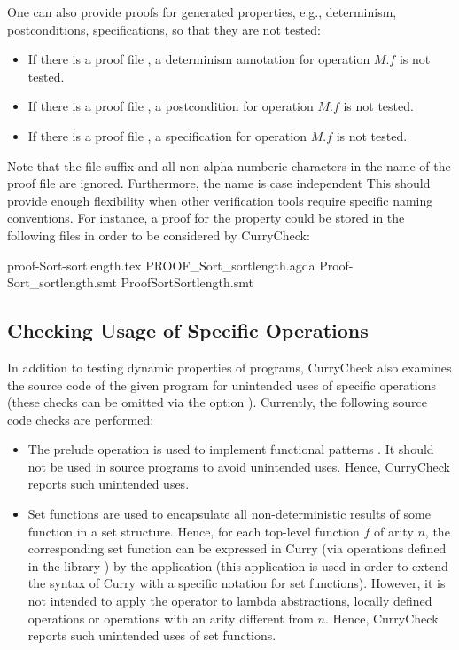 One can also provide proofs for generated properties,
e.g., determinism, postconditions, specifications,
so that they are not tested:
\begin{itemize}
\item
If there is a proof file ,
a determinism annotation for operation $M.f$ is not tested.
\item
If there is a proof file ,
a postcondition for operation $M.f$ is not tested.
\item
If there is a proof file ,
a specification for operation $M.f$ is not tested.
\end{itemize}
Note that the file suffix and all non-alpha-numberic characters
in the name of the proof file are ignored.
Furthermore, the name is case independent
This should provide enough flexibility when other verification tools
require specific naming conventions.
For instance, a proof for the property 
could be stored in the following files in order to be considered
by CurryCheck:
\begin{curry}
proof-Sort-sortlength.tex
PROOF_Sort_sortlength.agda
Proof-Sort_sortlength.smt
ProofSortSortlength.smt
\end{curry}


\subsection{Checking Usage of Specific Operations}

In addition to testing dynamic properties of programs,
CurryCheck also examines the source code of the given
program for unintended uses of specific operations
(these checks can be omitted via the option ).
Currently, the following source code checks are performed:

\begin{itemize}
\item
The prelude operation \ccode{=:<=} is used to implement
functional patterns \cite{AntoyHanus05LOPSTR}. It should not be
used in source programs to avoid unintended uses.
Hence, CurryCheck reports such unintended uses.
\item
Set functions \cite{AntoyHanus09} are used to encapsulate
all non-deterministic results of some function in a set structure.
Hence, for each top-level function $f$ of arity $n$,
the corresponding set function can be expressed in Curry
(via operations defined in the library )
by the application  (this application is used
in order to extend the syntax of Curry with a specific notation
for set functions).
However, it is not intended to apply the operator 
to lambda abstractions, locally defined operations
or operations with an arity different from $n$.
Hence, CurryCheck reports such unintended uses of set functions.
\end{itemize}



